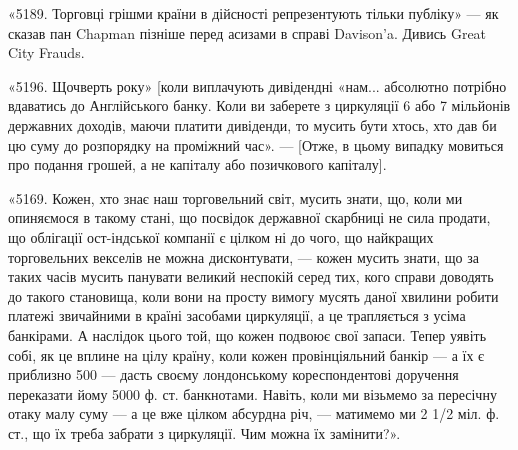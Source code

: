 «5189. Торговці грішми країни в дійсності репрезентують тільки публіку»
— як сказав пан Chapman пізніше перед асизами в справі Davison’a.
Дивись Great City Frauds.

«5196. Щочверть року» [коли виплачують дивідендні «нам... абсолютно
потрібно вдаватись до Англійського банку. Коли ви заберете з циркуляції 6 або
7 мільйонів державних доходів, маючи платити дивіденди, то мусить бути хтось,
хто дав би цю суму до розпорядку на проміжний час». — [Отже, в цьому випадку
мовиться про подання грошей, а не капіталу або позичкового капіталу].

«5169. Кожен, хто знає наш торговельний світ, мусить знати, що, коли
ми опиняємося в такому стані, що посвідок державної скарбниці не сила продати,
що облігації ост-індської компанії є цілком ні до чого, що найкращих
торговельних векселів не можна дисконтувати, — кожен мусить знати, що за таких
часів мусить панувати великий неспокій серед тих, кого справи доводять до
такого становища, коли вони на просту вимогу мусять даної хвилини робити
платежі звичайними в країні засобами циркуляції, а це трапляється з усіма
банкірами. А наслідок цього той, що кожен подвоює свої запаси. Тепер уявіть
собі, як це вплине на цілу країну, коли кожен провінціяльний банкір — а їх є
приблизно 500 — дасть своєму лондонському кореспондентові доручення переказати
йому 5000 ф. ст. банкнотами. Навіть, коли ми візьмемо за пересічну
отаку малу суму — а це вже цілком абсурдна річ, — матимемо ми 2 1/2 міл. ф. ст.,
що їх треба забрати з циркуляції. Чим можна їх замінити?».
